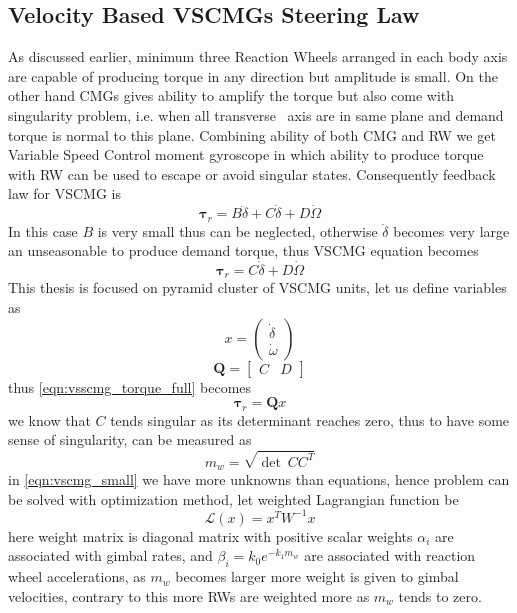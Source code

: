 \subsection{Velocity Based VSCMGs Steering Law}
As discussed earlier, minimum three Reaction Wheels arranged in each body axis are capable of producing torque in any direction but amplitude is small. On the other hand CMGs gives ability to amplify the torque but also come with singularity problem, i.e. when all transverse \ axis are in same plane and demand torque is normal to this plane. Combining ability of both CMG and RW we get Variable Speed Control moment gyroscope in which ability to produce torque with RW can be used to escape or avoid singular states. Consequently feedback law for VSCMG is
\begin{equation}
\mathbf{\tau }_{r} =B\ddot{\delta } +C\dot{\delta } +D\dot{\Omega }
\end{equation}
In this case $\displaystyle B$ is very small thus can be neglected, otherwise $\displaystyle \ddot{\delta }$ becomes very large an unseasonable to produce demand torque, thus VSCMG equation becomes
\begin{equation}
\mathbf{\tau }_{r} =C\dot{\delta } +D\dot{\Omega }
\label{eqn:vsscmg_torque_full}
\end{equation}
This thesis is focused on pyramid cluster of VSCMG units, let us define variables as
\begin{equation}
x=\begin{pmatrix}
\dot{\delta }\\
\dot{\omega }
\end{pmatrix}
\end{equation}
\begin{equation}
\mathbf{Q} =\begin{bmatrix}
C & D
\end{bmatrix}
\end{equation}
thus \autoref{eqn:vsscmg_torque_full} becomes
\begin{equation}
\mathbf{\tau }_{r} =\mathbf{Q} x
\label{eqn:vscmg_small}
\end{equation}
we know that $\displaystyle C$ tends singular as its determinant reaches zero, thus to have some sense of singularity, can be measured as
\begin{equation}
m_{w} =\sqrt{\det \ CC^{T}} 
\end{equation}
in \autoref{eqn:vscmg_small} we have more unknowns than equations, hence problem can be solved with optimization method, let weighted Lagrangian function be
\begin{equation}
\mathcal{L}( x) =x^{T} W^{-1} x
\end{equation}
here weight matrix is diagonal matrix with positive scalar weights $\displaystyle \alpha _{i}$ are associated with gimbal rates, and $\displaystyle \beta _{i} =k_{0} e^{-k_{1} m_{w}}$ are associated with reaction wheel accelerations, as $\displaystyle m_{w}$ becomes larger more weight is given to gimbal velocities, contrary to this more RWs are weighted more as $\displaystyle m_{w}$ tends to zero.

